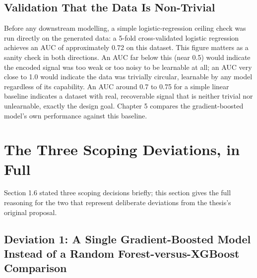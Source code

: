 \hypertarget{validation-that-the-data-is-non-trivial}{%
\subsection{Validation That the Data Is
Non-Trivial}\label{validation-that-the-data-is-non-trivial}}

Before any downstream modelling, a simple logistic-regression ceiling
check was run directly on the generated data: a 5-fold cross-validated
logistic regression achieves an AUC of approximately 0.72 on this
dataset. This figure matters as a sanity check in both directions. An
AUC far below this (near 0.5) would indicate the encoded signal was too
weak or too noisy to be learnable at all; an AUC very close to 1.0 would
indicate the data was trivially circular, learnable by any model
regardless of its capability. An AUC around 0.7 to 0.75 for a simple
linear baseline indicates a dataset with real, recoverable signal that
is neither trivial nor unlearnable, exactly the design goal. Chapter 5
compares the gradient-boosted model's own performance against this
baseline.

\hypertarget{the-three-scoping-deviations-in-full}{%
\section{The Three Scoping Deviations, in
Full}\label{the-three-scoping-deviations-in-full}}

Section 1.6 stated three scoping decisions briefly; this section gives
the full reasoning for the two that represent deliberate deviations from
the thesis's original proposal.

\hypertarget{deviation-1-a-single-gradient-boosted-model-instead-of-a-random-forest-versus-xgboost-comparison}{%
\subsection{Deviation 1: A Single Gradient-Boosted Model Instead of a
Random Forest-versus-XGBoost
Comparison}\label{deviation-1-a-single-gradient-boosted-model-instead-of-a-random-forest-versus-xgboost-comparison}}

